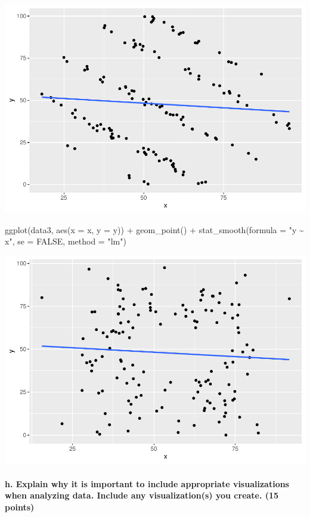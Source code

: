 \documentclass[
]{article}
\newenvironment{Shaded}{\begin{snugshade}}{\end{snugshade}}
\newcommand{\AttributeTok}[1]{\textcolor[rgb]{0.77,0.63,0.00}{#1}}
\newcommand{\ConstantTok}[1]{\textcolor[rgb]{0.00,0.00,0.00}{#1}}
\newcommand{\FunctionTok}[1]{\textcolor[rgb]{0.00,0.00,0.00}{#1}}
\newcommand{\NormalTok}[1]{#1}
\newcommand{\SpecialCharTok}[1]{\textcolor[rgb]{0.00,0.00,0.00}{#1}}
\newcommand{\StringTok}[1]{\textcolor[rgb]{0.31,0.60,0.02}{#1}}
\begin{document}
\includegraphics{Final_Exam_Answers_in_Progress_files/figure-latex/unnamed-chunk-11-2.pdf}

\begin{Shaded}
\begin{Highlighting}[]
\FunctionTok{ggplot}\NormalTok{(data3, }\FunctionTok{aes}\NormalTok{(}\AttributeTok{x =}\NormalTok{ x, }\AttributeTok{y =}\NormalTok{ y)) }\SpecialCharTok{+}
  \FunctionTok{geom\_point}\NormalTok{() }\SpecialCharTok{+}
  \FunctionTok{stat\_smooth}\NormalTok{(}\AttributeTok{formula =} \StringTok{"y \textasciitilde{} x"}\NormalTok{, }\AttributeTok{se =} \ConstantTok{FALSE}\NormalTok{, }\AttributeTok{method =} \StringTok{"lm"}\NormalTok{)}
\end{Highlighting}
\end{Shaded}

\includegraphics{Final_Exam_Answers_in_Progress_files/figure-latex/unnamed-chunk-11-3.pdf}

\hypertarget{h.-explain-why-it-is-important-to-include-appropriate-visualizations-when-analyzing-data.-include-any-visualizations-you-create.-15-points}{%
\paragraph{h. Explain why it is important to include appropriate
visualizations when analyzing data. Include any visualization(s) you
create. (15
points)}\label{h.-explain-why-it-is-important-to-include-appropriate-visualizations-when-analyzing-data.-include-any-visualizations-you-create.-15-points}}
\end{document}
